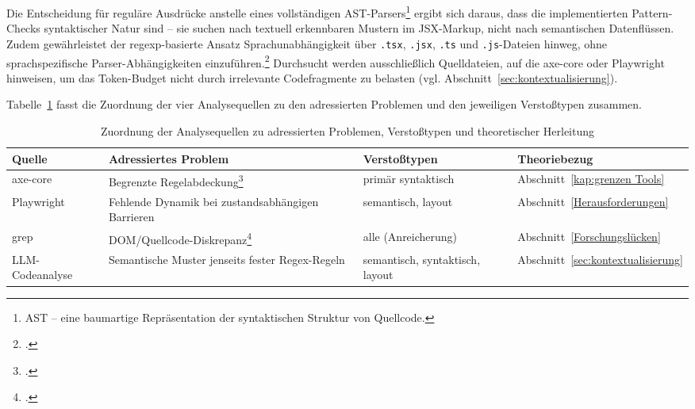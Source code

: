 Die Entscheidung für reguläre Ausdrücke anstelle eines vollständigen \ac{AST}-Parsers\footnote{\acl{AST} -- eine baumartige Repräsentation der syntaktischen Struktur von Quellcode.} ergibt sich daraus, dass die implementierten Pattern-Checks syntaktischer Natur sind -- sie suchen nach textuell erkennbaren Mustern im JSX-Markup, nicht nach semantischen Datenflüssen. Zudem gewährleistet der regexp-basierte Ansatz Sprachunabhängigkeit über \texttt{.tsx}, \texttt{.jsx}, \texttt{.ts} und \texttt{.js}-Dateien hinweg, ohne sprachspezifische Parser-Abhängigkeiten einzuführen.\footcite[Vgl.][S.~12]{bassi_assessment_2025} Durchsucht werden ausschließlich Quelldateien, auf die axe-core oder Playwright hinweisen, um das Token-Budget nicht durch irrelevante Codefragmente zu belasten (vgl. Abschnitt~\ref{sec:kontextualisierung}).

Tabelle~\ref{tab:tool-mapping} fasst die Zuordnung der vier Analysequellen zu den adressierten Problemen und den jeweiligen Verstoßtypen zusammen.

\begin{table}[H]
\centering
\small
\renewcommand{\arraystretch}{1.15}
\begin{tabular}{@{}>{\raggedright\arraybackslash}p{2.2cm}>{\raggedright\arraybackslash}p{4.4cm}>{\raggedright\arraybackslash}p{2.9cm}>{\raggedright\arraybackslash}p{3.5cm}@{}}
\toprule
\textbf{Quelle} & \textbf{Adressiertes Problem} & \textbf{Verstoßtypen} & \textbf{Theoriebezug} \\
\midrule
axe-core & Begrenzte Regelabdeckung\footcite[Vgl.][]{kodithuwakku_assessing_2025} & primär syntaktisch & Abschnitt~\ref{kap:grenzen Tools} \\
Playwright & Fehlende Dynamik bei zustandsabhängigen Barrieren & semantisch, layout & Abschnitt~\ref{Herausforderungen} \\
grep & \ac{DOM}/Quellcode-Diskrepanz\footcite[Vgl.][]{fathallah_accessguru_2025} & alle (Anreicherung) & Abschnitt~\ref{Forschungslücken} \\
LLM-Codeanalyse & Semantische Muster jenseits fester Regex-Regeln & semantisch, syntaktisch, layout & Abschnitt~\ref{sec:kontextualisierung} \\
\bottomrule
\end{tabular}
\caption{Zuordnung der Analysequellen zu adressierten Problemen, Verstoßtypen und theoretischer Herleitung}
\label{tab:tool-mapping}
\end{table}

